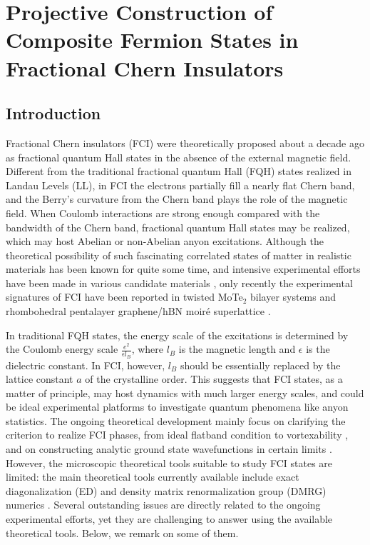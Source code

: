 \chapter{Projective Construction of Composite Fermion States in Fractional Chern Insulators}

\newcommand{\llangle}{\langle\!\langle}
\newcommand{\rrangle}{\rangle\!\rangle}


\section{Introduction}
Fractional Chern insulators (FCI) were theoretically proposed about a decade ago \cite{neupert2011fractional,tang2011high,sheng2011fractional,sun2011nearly,regnault2011fractional,xiao2011interface} as fractional quantum Hall states in the absence of the external magnetic field. Different from the traditional fractional quantum Hall (FQH) states realized in Landau Levels (LL), in FCI the electrons partially fill a nearly flat Chern band, and the Berry's curvature from the Chern band plays the role of the magnetic field. When Coulomb interactions are strong enough compared with the bandwidth of the Chern band, fractional quantum Hall states may be realized, which may host Abelian or non-Abelian anyon excitations. Although the theoretical possibility of such fascinating correlated states of matter in realistic materials has been known for quite some time, and intensive experimental efforts have been made in various candidate materials \cite{xie2021fractional}, only recently the experimental signatures of FCI have been reported in twisted MoTe$_2$ bilayer systems \cite{cai2023signatures,zeng2023thermodynamic,park2023observation,xu2023observation} and rhombohedral pentalayer graphene/hBN moiré superlattice \cite{lu2024fractional}.

In traditional FQH states, the energy scale of the excitations is determined by the Coulomb energy scale $\frac{e^2}{\epsilon l_B}$, where $l_B$ is the magnetic length and $\epsilon$ is the dielectric constant. In FCI, however, $l_B$ should be essentially replaced by the lattice constant $a$ of the crystalline order. This suggests that FCI states, as a matter of principle, may host dynamics with much larger energy scales, and could be ideal experimental platforms to investigate quantum phenomena like anyon statistics. The ongoing theoretical development mainly focus on clarifying the criterion to realize FCI phases, from ideal flatband condition to vortexability \cite{roy2014band,wang2021exact,wang2023origin,estienne2023ideal,ledwith2023vortexability}, and on constructing analytic ground state wavefunctions in certain limits \cite{ledwith2020fractional,dong2023many,wang2023origin}. However, the microscopic theoretical tools suitable to study FCI states are limited: the main theoretical tools currently available include exact diagonalization (ED) and density matrix renormalization group (DMRG) numerics \cite{haldane1985finite,feiguin2008density,dong2023anomalous,dong2023composite,yu2023fractional,goldman2023zero,dong2023theory}. Several outstanding issues are directly related to the ongoing experimental efforts, yet they are challenging to answer using the available theoretical tools. Below, we remark on some of them.

